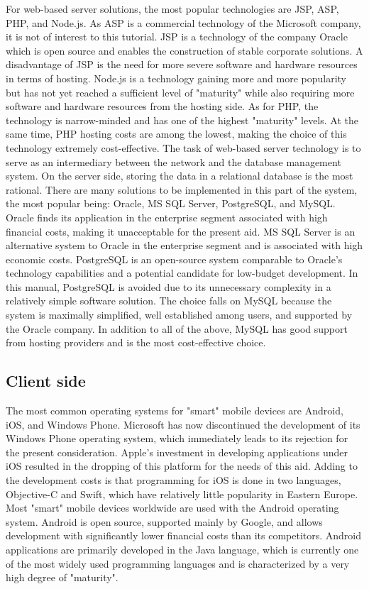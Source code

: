 For web-based server solutions, the most popular technologies are JSP, ASP, PHP, and Node.js. As ASP is a commercial technology of the Microsoft company, it is not of interest to this tutorial. JSP is a technology of the company Oracle which is open source and enables the construction of stable corporate solutions. A disadvantage of JSP is the need for more severe software and hardware resources in terms of hosting. Node.js is a technology gaining more and more popularity but has not yet reached a sufficient level of "maturity" while also requiring more software and hardware resources from the hosting side. As for PHP, the technology is narrow-minded and has one of the highest "maturity" levels. At the same time, PHP hosting costs are among the lowest, making the choice of this technology extremely cost-effective. The task of web-based server technology is to serve as an intermediary between the network and the database management system. On the server side, storing the data in a relational database is the most rational. There are many solutions to be implemented in this part of the system, the most popular being: Oracle, MS SQL Server, PostgreSQL, and MySQL. Oracle finds its application in the enterprise segment associated with high financial costs, making it unacceptable for the present aid. MS SQL Server is an alternative system to Oracle in the enterprise segment and is associated with high economic costs. PostgreSQL is an open-source system comparable to Oracle's technology capabilities and a potential candidate for low-budget development. In this manual, PostgreSQL is avoided due to its unnecessary complexity in a relatively simple software solution. The choice falls on MySQL because the system is maximally simplified, well established among users, and supported by the Oracle company. In addition to all of the above, MySQL has good support from hosting providers and is the most cost-effective choice.

\subsection{Client side}

The most common operating systems for "smart" mobile devices are Android, iOS, and Windows Phone. Microsoft has now discontinued the development of its Windows Phone operating system, which immediately leads to its rejection for the present consideration. Apple's investment in developing applications under iOS resulted in the dropping of this platform for the needs of this aid. Adding to the development costs is that programming for iOS is done in two languages, Objective-C and Swift, which have relatively little popularity in Eastern Europe. Most "smart" mobile devices worldwide are used with the Android operating system. Android is open source, supported mainly by Google, and allows development with significantly lower financial costs than its competitors. Android applications are primarily developed in the Java language, which is currently one of the most widely used programming languages and is characterized by a very high degree of "maturity".

